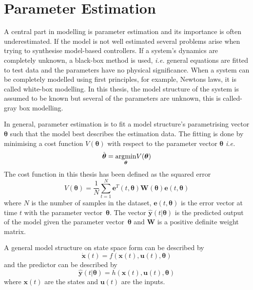 \chapter{Parameter Estimation} \label{cha:parameterEstimation}
A central part in modelling is parameter estimation and its importance is often underestimated. If the  model is not well estimated several problems arise when trying to synthesise model-based controllers. If a system's dynamics are completely unknown, a black-box method is used, \emph{i.e.} general equations are fitted to test data and the parameters have no physical significance. When a system can be completely modelled using first principles, for example, Newtons laws, it is called white-box modelling. In this thesis, the model structure of the system is assumed to be known but several of the parameters are unknown, this is called-gray box modelling. 

In general, parameter estimation is to fit a model structure's parametrising vector $\boldsymbol{\theta}$ such that the model best describes the estimation data. The fitting is done by minimising a cost function $V(\boldsymbol{\theta})$ with respect to the parameter vector $\boldsymbol{\theta}$ \emph{i.e.}
\begin{equation}
\hat{\boldsymbol{\theta}} = \underset{\boldsymbol{\theta}}{\operatorname*{\arg\!\min}} V(\boldsymbol{\theta})
\end{equation}
The cost function in this thesis has been defined as the squared error
\begin{equation}
    V(\boldsymbol{\theta}) = \frac{1}{N} \sum_{t=1}^{N} \boldsymbol{e}^T(t,\boldsymbol{\theta}) \boldsymbol{W}(\boldsymbol{\theta})  \boldsymbol{e}(t,\boldsymbol{\theta})
\end{equation}
where $N$ is the number of samples in the dataset, $\boldsymbol{e}(t,\boldsymbol{\theta})$ is the error vector at time $t$ with the parameter vector~$\boldsymbol{\theta}$. The vector $\hat{\boldsymbol{y}}(t|\boldsymbol{\theta})$ is the predicted output of the model given the parameter vector~$\boldsymbol{\theta}$ and $\boldsymbol{W}$ is a positive definite weight matrix.

A general model structure on state space form can be described by
\begin{equation}
\dot{\boldsymbol{x}}(t) = f(\boldsymbol{x}(t), \boldsymbol{u}(t), \boldsymbol{\theta})
\end{equation}
and the predictor can be described by
\begin{equation}
\hat{\boldsymbol{y}}(t|\boldsymbol{\theta}) = h(\boldsymbol{x}(t), \boldsymbol{u}(t), \boldsymbol{\theta})
\end{equation}
 where $\boldsymbol{x}(t)$ are the states and $\boldsymbol{u}(t)$ are the inputs. 

